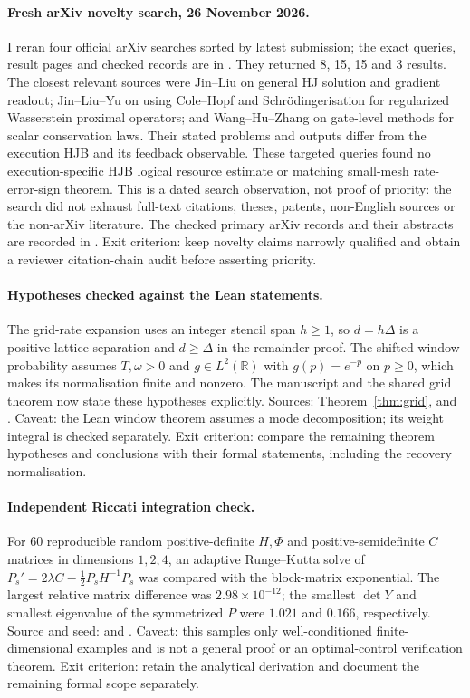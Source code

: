 \documentclass[11pt,a4paper]{article}
\begin{document}
\paragraph{Fresh arXiv novelty search, 26 November 2026.}
I reran four official arXiv searches sorted by latest submission; the exact
queries, result pages and checked records are in .
They returned 8, 15, 15 and 3 results. The closest relevant sources were
Jin--Liu on general HJ solution and gradient readout; Jin--Liu--Yu on using
Cole--Hopf and Schr\"odingerisation for regularized Wasserstein proximal
operators; and Wang--Hu--Zhang on gate-level methods for scalar conservation
laws. Their stated problems and outputs differ from the execution
HJB and its feedback observable. These targeted queries found no
execution-specific HJB logical resource estimate or matching small-mesh
rate-error-sign theorem. This is a dated search observation, not proof of
priority: the search did not exhaust full-text citations, theses, patents,
non-English sources or the non-arXiv literature. The checked primary arXiv
records and their abstracts are recorded in .
Exit criterion: keep novelty claims narrowly qualified and obtain a
reviewer citation-chain audit before asserting priority.

\paragraph{Hypotheses checked against the Lean statements.}
The grid-rate expansion uses an integer stencil span $h\ge1$, so $d=h\Delta$
is a positive lattice separation and $d\ge\Delta$ in the remainder proof.
The shifted-window probability assumes $T,\omega>0$ and
$g\in L^2(\mathbb R)$ with $g(p)=e^{-p}$ on $p\ge0$, which makes its
normalisation finite and nonzero. The manuscript and the shared grid theorem
now state these hypotheses explicitly. Sources: Theorem~\ref{thm:grid},
 and
. Caveat: the Lean window theorem
assumes a mode decomposition; its weight integral is checked separately.
Exit criterion: compare the remaining theorem hypotheses and conclusions with
their formal statements, including the recovery normalisation.

\paragraph{Independent Riccati integration check.}
For 60 reproducible random positive-definite $H,\Phi$ and positive-semidefinite
$C$ matrices in dimensions $1,2,4$, an adaptive Runge--Kutta solve of
$P_s'=2\lambda C-\tfrac12 P_sH^{-1}P_s$ was compared with the block-matrix
exponential. The largest relative matrix difference was $2.98\times10^{-12}$;
the smallest $\det Y$ and smallest eigenvalue of the symmetrized $P$ were
$1.021$ and $0.166$, respectively. Source and seed:
 and
. Caveat: this samples only
well-conditioned finite-dimensional examples and is not a general proof or an
optimal-control verification theorem. Exit criterion: retain the analytical
derivation and document the remaining formal scope separately.
\end{document}
